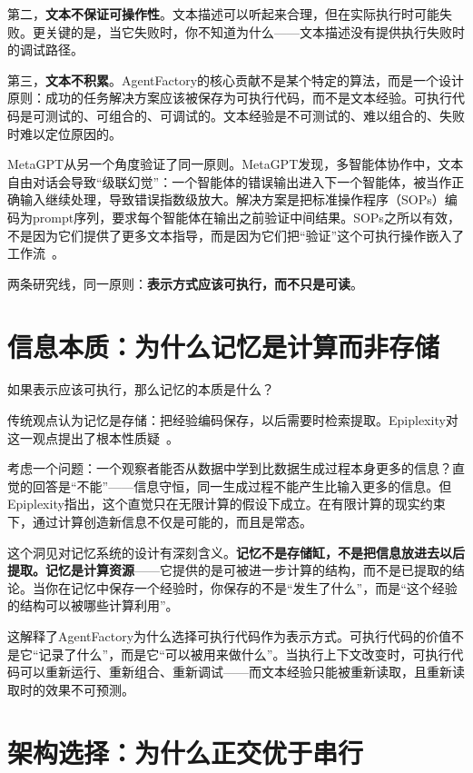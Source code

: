 \documentclass[11pt]{article}
\begin{document}
第二，\textbf{文本不保证可操作性}。文本描述可以听起来合理，但在实际执行时可能失败。更关键的是，当它失败时，你不知道为什么——文本描述没有提供执行失败时的调试路径。

第三，\textbf{文本不积累}。AgentFactory的核心贡献不是某个特定的算法，而是一个设计原则：成功的任务解决方案应该被保存为可执行代码，而不是文本经验。可执行代码是可测试的、可组合的、可调试的。文本经验是不可测试的、难以组合的、失败时难以定位原因的。

MetaGPT从另一个角度验证了同一原则。MetaGPT发现，多智能体协作中，文本自由对话会导致``级联幻觉''：一个智能体的错误输出进入下一个智能体，被当作正确输入继续处理，导致错误指数级放大。解决方案是把标准操作程序（SOPs）编码为prompt序列，要求每个智能体在输出之前验证中间结果。SOPs之所以有效，不是因为它们提供了更多文本指导，而是因为它们把``验证''这个可执行操作嵌入了工作流~\cite{metagpt}。

两条研究线，同一原则：\textbf{表示方式应该可执行，而不只是可读}。

\section{信息本质：为什么记忆是计算而非存储}

如果表示应该可执行，那么记忆的本质是什么？

传统观点认为记忆是存储：把经验编码保存，以后需要时检索提取。Epiplexity对这一观点提出了根本性质疑~\cite{epiplexity}。

考虑一个问题：一个观察者能否从数据中学到比数据生成过程本身更多的信息？直觉的回答是``不能''——信息守恒，同一生成过程不能产生比输入更多的信息。但Epiplexity指出，这个直觉只在无限计算的假设下成立。在有限计算的现实约束下，通过计算创造新信息不仅是可能的，而且是常态。

这个洞见对记忆系统的设计有深刻含义。\textbf{记忆不是存储缸，不是把信息放进去以后提取。记忆是计算资源}——它提供的是可被进一步计算的结构，而不是已提取的结论。当你在记忆中保存一个经验时，你保存的不是``发生了什么''，而是``这个经验的结构可以被哪些计算利用''。

这解释了AgentFactory为什么选择可执行代码作为表示方式。可执行代码的价值不是它``记录了什么''，而是它``可以被用来做什么''。当执行上下文改变时，可执行代码可以重新运行、重新组合、重新调试——而文本经验只能被重新读取，且重新读取时的效果不可预测。

\section{架构选择：为什么正交优于串行}
\end{document}
